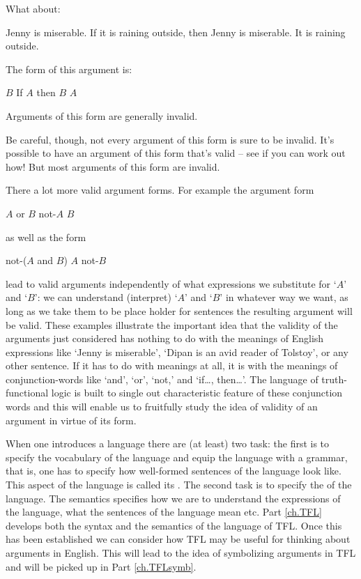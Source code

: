 What about:
	\begin{earg}
		\prem Jenny is miserable.
		\prem If it is raining outside, then Jenny is miserable.
		\conc It is raining outside.
	\end{earg}
The form of this argument is:
\begin{earg}
\prem	$B$
\prem	If $A$ then $B$
\conc $A$
\end{earg}
Arguments of this form are generally invalid.

Be careful, though, not every argument of this form is sure to be invalid.
It’s possible to have an argument of this form that’s valid – see if you can work out how!
But most arguments of this form are invalid.

There a lot more valid argument forms. For example the
argument form
	\begin{earg}
		\prem $A$ or $B$
		\prem not-$A$
		\conc $B$
	\end{earg}
as well as the form
	\begin{earg}
		\prem not-($A$ and $B$)
		\prem $A$
		\conc not-$B$
	\end{earg}
lead to valid arguments independently of what expressions we substitute for `$A$' and `$B$': we can understand (interpret) `$A$' and `$B$' in whatever way we want, as long as we take them to be place holder for sentences the resulting argument will be valid. These examples illustrate the important idea that the validity of the arguments just considered has nothing to do with the meanings of English expressions like `Jenny is miserable', `Dipan is an avid reader of Tolstoy', or any other sentence. If it has to do with meanings at all, it is with the meanings of conjunction-words like `and', `or', `not,' and `if\ldots, then\ldots'. The language of truth-functional logic is built to single out characteristic feature of these conjunction words and this will enable us to fruitfully study the idea of validity of an argument in virtue of its form.

When one introduces a language there are (at least) two task: the first is to specify the vocabulary of the language and equip the language with a grammar, that is, one has to specify how well-formed sentences of the language look like. This aspect of the language is called its . The second task is to specify the  of the language. The semantics specifies how we are to understand the expressions of the language, what the sentences of the language mean etc. Part \ref{ch.TFL} develops both the syntax and the semantics of the language of TFL. Once this has been established we can consider how TFL may be useful for thinking about arguments in English. This will lead to the idea of symbolizing arguments in TFL and will be picked up in Part \ref{ch.TFLsymb}.

